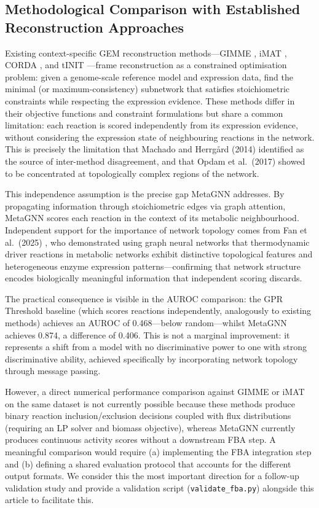 \documentclass[12pt,a4paper]{article}
\begin{document}
\subsection{Methodological Comparison with Established Reconstruction Approaches}

Existing context-specific GEM reconstruction methods---GIMME \cite{Becker2008}, iMAT \cite{Zur2010}, CORDA \cite{Schultz2016}, and tINIT \cite{Agren2012}---frame reconstruction as a constrained optimisation problem: given a genome-scale reference model and expression data, find the minimal (or maximum-consistency) subnetwork that satisfies stoichiometric constraints while respecting the expression evidence. These methods differ in their objective functions and constraint formulations but share a common limitation: each reaction is scored independently from its expression evidence, without considering the expression state of neighbouring reactions in the network. This is precisely the limitation that Machado and Herrg\r{a}rd (2014) identified as the source of inter-method disagreement, and that Opdam et al.\ (2017) showed to be concentrated at topologically complex regions of the network.

This independence assumption is the precise gap MetaGNN addresses. By propagating information through stoichiometric edges via graph attention, MetaGNN scores each reaction in the context of its metabolic neighbourhood. Independent support for the importance of network topology comes from Fan et al.\ (2025) \cite{Fan2025}, who demonstrated using graph neural networks that thermodynamic driver reactions in metabolic networks exhibit distinctive topological features and heterogeneous enzyme expression patterns---confirming that network structure encodes biologically meaningful information that independent scoring discards.

The practical consequence is visible in the AUROC comparison: the GPR Threshold baseline (which scores reactions independently, analogously to existing methods) achieves an AUROC of 0.468---below random---whilst MetaGNN achieves 0.874, a difference of 0.406. This is not a marginal improvement: it represents a shift from a model with no discriminative power to one with strong discriminative ability, achieved specifically by incorporating network topology through message passing.

However, a direct numerical performance comparison against GIMME or iMAT on the same dataset is not currently possible because these methods produce binary reaction inclusion/exclusion decisions coupled with flux distributions (requiring an LP solver and biomass objective), whereas MetaGNN currently produces continuous activity scores without a downstream FBA step. A meaningful comparison would require (a) implementing the FBA integration step and (b) defining a shared evaluation protocol that accounts for the different output formats. We consider this the most important direction for a follow-up validation study and provide a validation script (\texttt{validate\_fba.py}) alongside this article to facilitate this.
\end{document}
